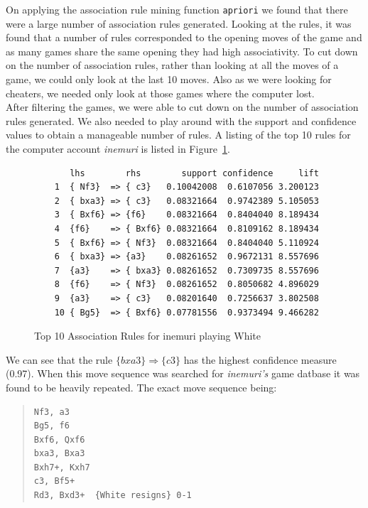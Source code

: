 \documentclass{article}
\begin{document}
On applying the association rule mining function \verb=apriori= we found that there were a large number of association rules generated. Looking at the rules, it was found that a number of rules corresponded to the opening moves of the game and as many games share the same opening they had high associativity. To cut down on the number of association rules, rather than looking at all the moves of a game, we could only look at the last 10 moves. Also as we were looking for cheaters, we needed only look at those games where the computer lost.\\


After filtering the games, we were able to cut down on the number of association rules generated. We also needed to play around with the support and confidence values to obtain a manageable number of rules. A listing of the top 10 rules for the computer account {\sl inemuri} is listed in Figure~\ref{fig:inemuriwhite}.

\begin{figure}[htp]
\begin{verbatim}
       lhs        rhs        support confidence     lift
    1  { Nf3}  => { c3}   0.10042008  0.6107056 3.200123
    2  { bxa3} => { c3}   0.08321664  0.9742389 5.105053
    3  { Bxf6} => {f6}    0.08321664  0.8404040 8.189434
    4  {f6}    => { Bxf6} 0.08321664  0.8109162 8.189434
    5  { Bxf6} => { Nf3}  0.08321664  0.8404040 5.110924
    6  { bxa3} => {a3}    0.08261652  0.9672131 8.557696
    7  {a3}    => { bxa3} 0.08261652  0.7309735 8.557696
    8  {f6}    => { Nf3}  0.08261652  0.8050682 4.896029
    9  {a3}    => { c3}   0.08201640  0.7256637 3.802508
    10 { Bg5}  => { Bxf6} 0.07781556  0.9373494 9.466282
\end{verbatim}

\caption{Top 10 Association Rules for inemuri playing White}
\label{fig:inemuriwhite}
\end{figure}

We can see that the rule $\{bxa3\} \Rightarrow \{c3\}$ has the highest confidence measure (0.97). When this move sequence was searched for {\sl inemuri's} game datbase it was found to be heavily repeated. The exact move sequence being:

\begin{quote}
\begin{verbatim}
Nf3, a3 
Bg5, f6
Bxf6, Qxf6
bxa3, Bxa3
Bxh7+, Kxh7
c3, Bf5+
Rd3, Bxd3+  {White resigns} 0-1
\end{verbatim}
\end{quote}
\end{document}
